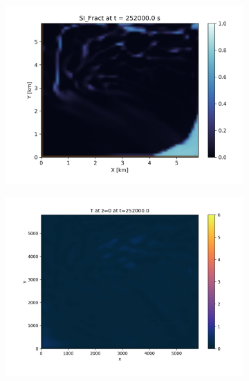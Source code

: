 \documentclass[11pt]{article}
\begin{document}
\clearpage

\begin{figure}[h!]
\centering
\begin{subfigure}{0.45\linewidth}
	\includegraphics[width=\linewidth]{iceAdvect/advScheme-33-surface-ice-hd-0000025200.png}
\end{subfigure}
\begin{subfigure}{0.45\linewidth}
\includegraphics[width=\linewidth]{iceAdvect/advScheme-33-surface-T-hd-0000025200.png}
\end{subfigure}


\end{figure}
\end{document}
